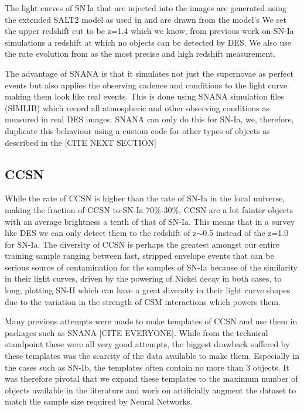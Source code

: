 The light curves of SN\,Ia that are injected into the images are generated using the extended SALT2 model as used in \citet{Betoule2014} and are drawn from the model's We set the upper redshift cut to be z=1.4 which we know, from previous work on SN-Ia simulations a redshift at which no objects can be detected by DES. We also use the rate evolution from \citet{Perrett2012} as the most precise and high redshift measurement.

The advantage of SNANA is that it simulates not just the supernovae as perfect events but also applies the observing cadence and conditions to the light curve making them look like real events. This is done using SNANA simulation files (SIMLIB) which record all atmospheric and other observing conditions as measured in real DES images. SNANA can only do this for SN-Ia, we, therefore, duplicate this behaviour using a custom code for other types of objects as described in the [CITE NEXT SECTION]

\subsection{CCSN}
While the rate of CCSN is higher than the rate of SN-Ia in the local universe, making the fraction of CCSN to SN-Ia 70\%-30\%, CCSN are a lot fainter objects with an average brightness a tenth of that of SN-Ia. This means that in a survey like DES we can only detect them to the redshift of z$\sim$0.5 instead of the z=1.0 for SN-Ia. The diversity of CCSN is perhaps the greatest amongst our entire training sample ranging between fast, stripped envelope events that can be serious source of contamination for the samples of SN-Ia because of the similarity in their light curves, driven by the powering of Nickel decay in both cases, to long, plotting SN-II which can have a great diversity in their light curve shapes due to the variation in the strength of CSM interactions which powers them.

Many previous attempts were made to make templates of CCSN and use them in packages such as SNANA [CITE EVERYONE]. While from the technical standpoint these were all very good attempts, the biggest drawback suffered by these templates was the scarcity of the data available to make them. Especially in the cases such as SN-Ib, the templates often contain no more than 3 objects. It was therefore pivotal that we expand these templates to the maximum number of objects available in the literature and work on artificially augment the dataset to match the sample size required by Neural Networks.


